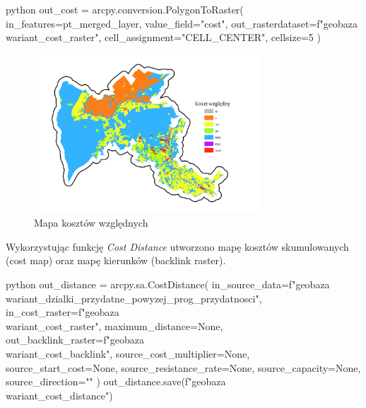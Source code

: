 \documentclass{article}
\begin{document}
\begin{mintedbox}{python}
out_cost = arcpy.conversion.PolygonToRaster(
    in_features=pt_merged_layer,
    value_field="cost",
    out_rasterdataset=f"{geobaza}\\{wariant}_cost_raster",
    cell_assignment="CELL_CENTER",
    cellsize=5
)
\end{mintedbox}
\vspace{5pt}

\begin{figure}[H]
    \centering
    \includegraphics[width=0.75\textwidth]{img/cost-raster.jpg}
    \caption{Mapa kosztów względnych}
\end{figure}
\vspace{10pt}

Wykorzystując funkcję \textit{Cost Distance} utworzono mapę kosztów skumulowanych (cost map) oraz mapę kierunków (backlink raster).
\vspace{5pt}

\begin{mintedbox}{python}
out_distance = arcpy.sa.CostDistance(
    in_source_data=f"{geobaza}\\{wariant}_dzialki_przydatne_powyzej_{prog_przydatnosci}",
    in_cost_raster=f"{geobaza}\\{wariant}_cost_raster",
    maximum_distance=None,
    out_backlink_raster=f"{geobaza}\\{wariant}_cost_backlink",
    source_cost_multiplier=None,
    source_start_cost=None,
    source_resistance_rate=None,
    source_capacity=None,
    source_direction=""
)
out_distance.save(f"{geobaza}\\{wariant}_cost_distance")
\end{mintedbox}
\vspace{5pt}
\end{document}
